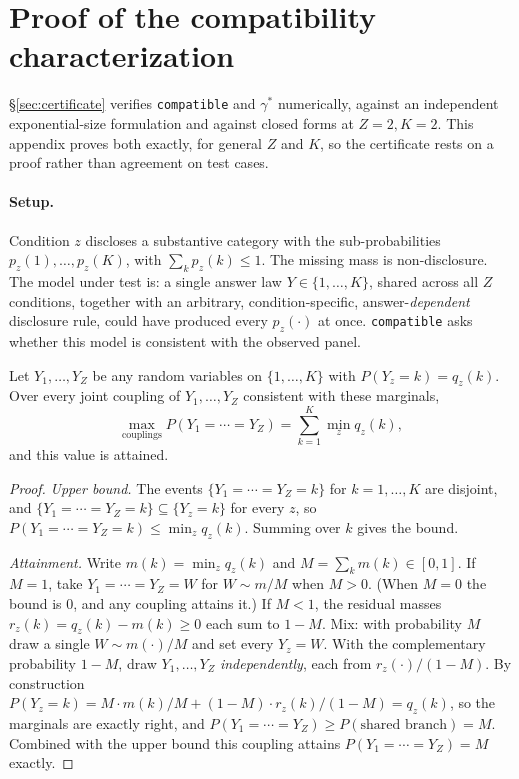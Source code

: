 \section{Proof of the compatibility characterization}
\label{app:proof}

\S\ref{sec:certificate} verifies \texttt{compatible} and $\gamma^*$
numerically, against an independent exponential-size formulation and against
closed forms at $Z=2,K=2$. This appendix proves both exactly, for general
$Z$ and $K$, so the certificate rests on a proof rather than agreement on
test cases.

\paragraph{Setup.} Condition $z$ discloses a substantive category with the
sub-probabilities $p_z(1),\dots,p_z(K)$, with $\sum_k p_z(k) \le 1$. The
missing mass is non-disclosure. The model under test is: a single answer law
$Y\in\{1,\dots,K\}$, shared across all $Z$ conditions, together with an
arbitrary, condition-specific, answer-\emph{dependent} disclosure rule, could
have produced every $p_z(\cdot)$ at once. \texttt{compatible} asks whether
this model is consistent with the observed panel.

\begin{lemma}
\label{lem:agreement}
Let $Y_1,\dots,Y_Z$ be any random variables on $\{1,\dots,K\}$ with
$P(Y_z=k)=q_z(k)$. Over every joint coupling of $Y_1,\dots,Y_Z$ consistent
with these marginals,
\[
\max_{\text{couplings}} P(Y_1=\cdots=Y_Z) = \sum_{k=1}^K \min_z q_z(k),
\]
and this value is attained.
\end{lemma}
\begin{proof}
\emph{Upper bound.} The events $\{Y_1=\cdots=Y_Z=k\}$ for $k=1,\dots,K$ are
disjoint, and $\{Y_1=\cdots=Y_Z=k\}\subseteq\{Y_z=k\}$ for every $z$, so
$P(Y_1=\cdots=Y_Z=k)\le\min_z q_z(k)$. Summing over $k$ gives the bound.

\emph{Attainment.} Write $m(k)=\min_z q_z(k)$ and $M=\sum_k m(k)\in[0,1]$.
If $M=1$, take $Y_1=\cdots=Y_Z=W$ for $W\sim m/M$ when $M>0$. (When
$M=0$ the bound is $0$, and any coupling attains it.) If $M<1$, the residual masses
$r_z(k)=q_z(k)-m(k)\ge0$ each sum to $1-M$. Mix: with probability $M$ draw a
single $W\sim m(\cdot)/M$ and set every $Y_z=W$. With the complementary
probability $1-M$, draw $Y_1,\dots,Y_Z$ \emph{independently}, each from
$r_z(\cdot)/(1-M)$. By construction $P(Y_z=k)=M\cdot m(k)/M + (1-M)\cdot
r_z(k)/(1-M) = q_z(k)$, so the marginals are exactly right, and
$P(Y_1=\cdots=Y_Z)\ge P(\text{shared branch})=M$. Combined with the upper
bound this coupling attains $P(Y_1=\cdots=Y_Z)=M$ exactly.
\end{proof}

